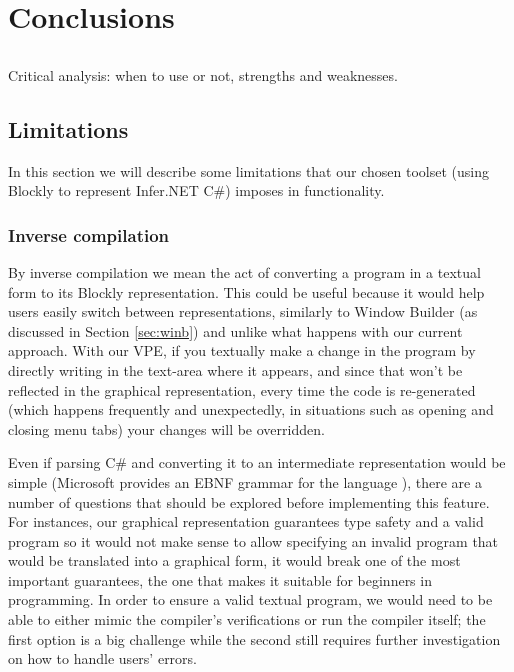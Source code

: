 \chapter{Conclusions} \label{chap:concl}

\section*{}

Critical analysis: when to use or not, strengths and weaknesses.

\section{Limitations}

In this section we will describe some limitations that our chosen toolset (using
Blockly to represent Infer.NET C#) imposes in functionality.

\subsection{Inverse compilation}

By inverse compilation we mean the act of converting a program in a textual form
to its Blockly representation. This could be useful because it would help users
easily switch between representations, similarly to Window Builder (as discussed in Section \ref{sec:winb})
and unlike what happens with our current approach.
With our VPE, if you textually make a change in the program by directly
writing in the text-area where it appears,
and since that won't be reflected in the graphical representation, every time
the code is re-generated (which happens frequently and unexpectedly, in situations
such as opening and closing menu tabs) your changes will be overridden.

Even if parsing C# and converting it to an intermediate representation would be
simple (Microsoft provides an EBNF grammar for the language \cite{ebnfcs}), there
are a number of questions that should be explored before implementing this feature.
For instances, our graphical representation guarantees type safety and a valid
program so it would not make sense to allow specifying an invalid program that
would be translated into a graphical form, it would break one of the most important
guarantees, the one that makes it suitable for beginners in programming. In
order to ensure a valid textual program, we would need to be able to either mimic
the compiler's verifications or run the compiler itself; the first option is
a big challenge while the second still requires further investigation on how
to handle users' errors.

